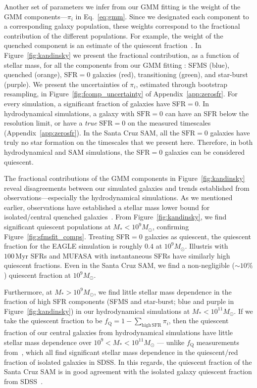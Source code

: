 \documentclass[preprint2,tighten]{aastex62}
\begin{document}
Another set of parameters we infer from our GMM fitting is the weight of the 
GMM components---$\pi_i$ in Eq.~\ref{eq:gmm}. Since we designated each component 
to a corresponding galaxy population, these weights correspond to the fractional
contribution of the different populations. For example, the weight of the 
quenched component is an estimate of the quiescent 
fraction~\citep[\emph{e.g.}][]{blanton2009, geha2012, hahn2015}. In 
Figure~\ref{fig:kandinsky} we present the fractional contribution, as a function 
of stellar mass, for all the components from our GMM fitting : SFMS (blue), 
quenched (orange), $\mathrm{SFR}=0$ galaxies (red), transitioning (green), 
and star-burst (purple). We present the uncertainties of $\pi_i$, estimated
through bootstrap resampling, in Figure~\ref{fig:fcomp_uncertainty} of 
Appendix~\ref{app:zerosfr}. 
For every simulation, a significant fraction of galaxies have SFR$=0$. 
In hydrodynamical simulations, a galaxy with $\mathrm{SFR}{=}0$ can have an SFR below the resolution limit, or have a \emph{true} $\mathrm{SFR}{=}0$ on the measured timescales (Appendix~\ref{app:zerosfr}). In the Santa 
Cruz SAM, all the $\mathrm{SFR}{=}0$ galaxies have truly no star formation on the timescales that we present here. Therefore, in both hydrodynamical and SAM simulations, the SFR$=0$ 
galaxies can be considered quiescent. 

The fractional contributions of the GMM components in Figure~\ref{fig:kandinsky}
reveal disagreements between our simulated galaxies and trends established
from observations---especially the hydrodynamical simulations. As we 
mentioned earlier, observations have established a stellar mass lower bound 
for isolated/central quenched galaxies~\citep{geha2012}. From Figure~\ref{fig:kandinsky}, 
we find significant quiescent populations at $M_* < 10^9 M_\odot$, confirming 
Figure~\ref{fig:sfmsfit_comps}. Treating SFR$=0$ galaxies as quiescent, the quiescent 
fraction for the EAGLE simulation is roughly $0.4$ at $10^9M_\odot$. 
Illustris with $100\,\mathrm{Myr}$ SFRs and MUFASA with instantaneous SFRs
have similarly high quiescent fractions. Even in the Santa Cruz SAM, we 
find a non-negligible ($\sim 10\%$) quiescent fraction at $10^9M_\odot$. 

Furthermore, at $M_* > 10^9M_\odot$, we find little stellar mass dependence in the 
fraction of high SFR components (SFMS and star-burst; blue and purple 
in Figure~\ref{fig:kandinsky}) in our hydrodynamical simulations at 
$M_* < 10^{11}M_\odot$. If we take the quiescent fraction to be 
$f_\mathrm{Q} = 1 - \sum_{\mathrm{high\,SFR}} \pi_i$, then the 
quiescent fraction of our central galaxies from hydrodynamical simulations 
have little stellar mass dependence over $10^9 < M_* < 10^{11} M_\odot$ ---
unlike $f_\mathrm{Q}$ measurements from~\cite{baldry2006,peng2010,hahn2015},
which all find significant stellar mass dependence in the quiescent/red fraction of 
isolated galaxies in SDSS. In this regards, the quiescent fraction of the 
Santa Cruz SAM is in good agreement with the isolated galaxy 
quiescent fraction from SDSS~\citep{baldry2006,peng2010,hahn2015}.
\end{document}
